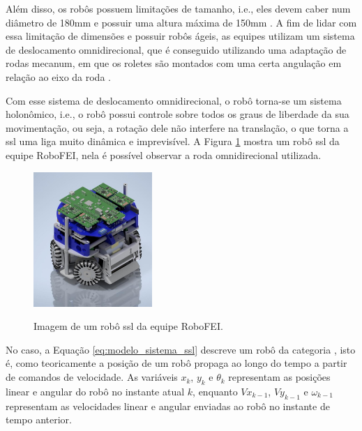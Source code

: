 \documentclass[acronym, symbols, table]{fei}
\begin{document}
		Além disso, os robôs possuem limitações de tamanho, i.e., eles devem caber num diâmetro de 180mm e possuir uma altura máxima de 150mm \cite{rules}. A fim de lidar com essa limitação de dimensões e possuir robôs ágeis, as equipes utilizam um sistema de deslocamento omnidirecional, que é conseguido utilizando uma adaptação de rodas mecanum, em que os roletes são montados com uma certa angulação em relação ao eixo da roda \cite{aguiarreformulaccao}.
		
		Com esse sistema de deslocamento omnidirecional, o robô torna-se um sistema holonômico, i.e., o robô possui controle sobre todos os graus de liberdade da sua movimentação, ou seja, a rotação dele não interfere na translação, o que torna a \acrshort{ssl} uma liga muito dinâmica e imprevisível. A Figura \ref{fig:exemplo_robo_ssl} mostra um robô \acrshort{ssl} da equipe RoboFEI, nela é possível observar a roda omnidirecional utilizada.
		
		\begin{figure}[!htb]
			\centering
			\caption{Imagem de um robô \acrshort{ssl} da equipe RoboFEI.} 
			\includegraphics[width=0.4\textwidth]{Foto_Robo_2012.jpg}
			\label{fig:exemplo_robo_ssl}
		\end{figure}
		
		No caso, a Equação \eqref{eq:modelo_sistema_ssl} descreve um robô da categoria , isto é, como teoricamente a posição de um robô propaga ao longo do tempo a partir de comandos de velocidade. As variáveis $x_k$, $y_k$ e $\theta_k$ representam as posições linear e angular do robô no instante atual $k$, enquanto $Vx_{k-1}$, $Vy_{k-1}$ e $\omega_{k-1}$ representam as velocidades linear e angular enviadas ao robô no instante de tempo anterior.
		
\end{document}
